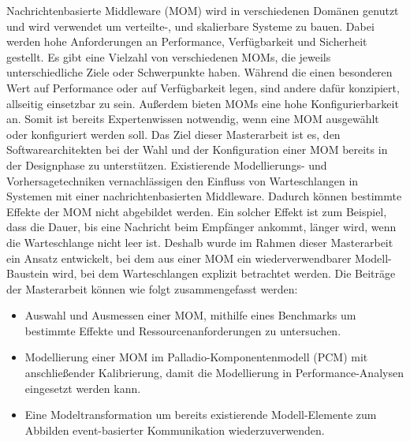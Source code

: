 
\Abstract
Nachrichtenbasierte Middleware (MOM) wird in verschiedenen Domänen genutzt und wird verwendet um verteilte-, und skalierbare Systeme zu bauen. Dabei werden hohe Anforderungen an Performance, Verfügbarkeit und Sicherheit gestellt.
Es gibt eine Vielzahl von verschiedenen MOMs, die jeweils unterschiedliche Ziele oder Schwerpunkte haben. Während die einen besonderen Wert auf Performance oder auf Verfügbarkeit legen, sind andere dafür konzipiert, allseitig einsetzbar zu sein. Außerdem bieten MOMs eine hohe Konfigurierbarkeit an. Somit ist bereits Expertenwissen notwendig, wenn eine MOM ausgewählt oder konfiguriert werden soll. Das Ziel dieser Masterarbeit ist es, den Softwarearchitekten bei der Wahl und der Konfiguration einer MOM bereits in der Designphase zu unterstützen.
Existierende Modellierungs- und Vorhersagetechniken vernachlässigen den Einfluss von Warteschlangen in Systemen mit einer nachrichtenbasierten Middleware. Dadurch können bestimmte Effekte der MOM nicht abgebildet werden. Ein solcher Effekt ist zum Beispiel, dass die Dauer, bis eine Nachricht beim Empfänger ankommt, länger wird, wenn die Warteschlange nicht leer ist.
Deshalb wurde im Rahmen dieser Masterarbeit ein Ansatz entwickelt, bei dem aus einer MOM ein wiederverwendbarer Modell-Baustein wird, bei dem Warteschlangen explizit betrachtet werden. Die Beiträge der Masterarbeit können wie folgt zusammengefasst werden:
\begin{itemize}
    \item Auswahl und Ausmessen einer MOM, mithilfe eines Benchmarks um bestimmte Effekte und Ressourcenanforderungen zu untersuchen.
    \item Modellierung einer MOM im Palladio-Komponentenmodell (PCM) mit anschließender Kalibrierung, damit die Modellierung in Performance-Analysen eingesetzt werden kann.
    \item Eine Modeltransformation um bereits existierende Modell-Elemente zum Abbilden event-basierter Kommunikation wiederzuverwenden.
\end{itemize}
